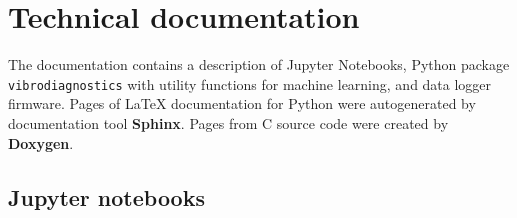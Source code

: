 \thispagestyle{empty}
\chapter{Technical documentation} \label{appendix:technical-docs}
\renewcommand*{\thepage}{B-\arabic{page}}
The documentation contains a description of Jupyter Notebooks, Python package \verb|vibrodiagnostics| with utility functions for machine learning, and data logger firmware. Pages of \LaTeX \; documentation for Python were autogenerated by documentation tool \textbf{Sphinx}. Pages from C source code were created by \textbf{Doxygen}. 

\section{Jupyter notebooks}
